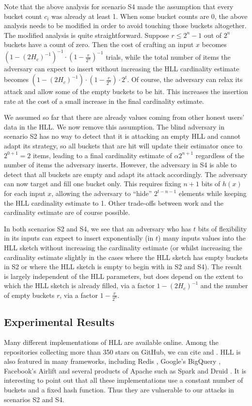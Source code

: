 \documentclass{IEEEtran}
\begin{document}
Note that the above analysis for scenario S4 made the assumption that every bucket count $c_i$ was already at least 1. When some bucket counts are 0, the above analysis needs to be modified in order to avoid touching those buckets altogether. The modified analysis is quite straightforward. Suppose $r \le 2^n-1$ out of $2^n$ buckets have a count of zero. Then the cost of crafting an input $x$ becomes $(1-(2H_c)^{-1})^{-1} \cdot (1- \frac{r}{2^n})^{-1}$ trials, while the total number of items the adversary can expect to insert without increasing the HLL cardinality estimate becomes $(1-(2H_c)^{-1}) \cdot (1- \frac{r}{2^n})\cdot 2^t$. Of course, the adversary can relax its attack and allow some of the empty buckets to be hit. This increases the insertion rate at the cost of a small increase in the final cardinality estimate.

We assumed so far that there are already values coming from other honest users' data in the HLL. We now remove this assumption. The blind adversary in scenario S2 has no way to detect that it is attacking an empty HLL and cannot adapt its strategy, so all buckets that are hit will update their estimator once to $2^{0+1}=2$ items, leading to a final cardinality estimate of $\alpha2^{n+1}$ regardless of the number of items the adversary inserts. However, the adversary in S4 is able to detect that all buckets are empty and adapt its attack accordingly. The adversary can now target and fill one bucket only. This requires fixing $n+1$ bits of $h(x)$ for each input $x$, allowing the adversary to ``hide'' $2^{t-n-1}$ elements while keeping the HLL cardinality estimate to 1. Other trade-offs between work and the cardinality estimate are of course possible.

In both scenarios S2 and S4, we see that an adversary who has $t$ bits of flexibility in its inputs can expect to insert exponentially (in $t$) many inputs values into the HLL sketch without increasing the cardinality estimate (or whilst increasing the cardinality estimate slightly in the cases where the HLL sketch has empty buckets in S2 or where the HLL sketch is empty to begin with in S2 and S4). The result is largely independent of the HLL parameters, but does depend on the extent to which the HLL sketch is already filled, via a factor $1-(2H_c)^{-1}$ and the number of empty buckets $r$, via a factor $1- \frac{r}{2^n}$.


\subsection{Experimental Results}
Many different implementations of HLL are available online. Among the repositories collecting more than 350 stars on GitHub, we can cite \cite{clahll} and \cite{datasketch}. HLL is also featured in many frameworks, including Redis \cite{redis}, Google's BigQuery \cite{bigquery}, Facebook's Airlift \cite{airlift} and several products of Apache such as Spark \cite{spahll} and Druid \cite{druhll}. It is interesting to point out that all these implementations use a constant number of buckets and a fixed hash function. Thus they are vulnerable to our attacks in scenarios S2 and S4.
\end{document}
